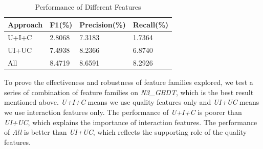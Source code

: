 \documentclass{llncs}
\begin{document}
\begin{table}[htbp]
	\normalsize
	\centering
	\caption{Performance of Different Features}
	\begin{tabular}{|p{80pt}|p{60pt}|p{60pt}|p{60pt}|}
		\hline
		Approach & F1(\%) & Precision(\%) & Recall(\%) \\
		\hline
		U+I+C & 2.8068 & 7.3183 & 1.7364 \\
		UI+UC & 7.4938 & 8.2366 & 6.8740 \\
		\hline
		All & 8.4719 & 8.6591 & 8.2926 \\
		\hline
	\end{tabular}
	\label{tab:fea}
\end{table}

To prove the effectiveness and robustness of feature families explored,
we test a series of combination of feature families on 
\textit{N3\_GBDT}, which is the best result mentioned above.
\textit{U+I+C} means we use quality features only and \textit{UI+UC} means we use interaction
features only.
The performance of \textit{U+I+C} is poorer than \textit{UI+UC}, which explains the importance of interaction features.
The performance of \textit{All} is better than \textit{UI+UC}, which reflects the supporting role of the quality features.


\end{document}
